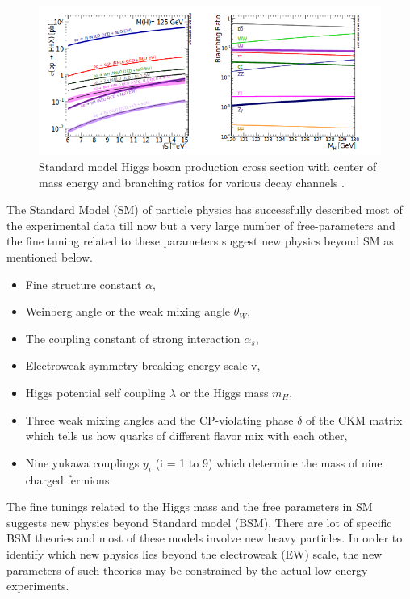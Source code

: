 \documentclass[final,3p]{CSP}
\begin{document}
\begin{figure}[H]
  \centering
   \includegraphics[scale=0.7]{./cd2.png}
  \caption{Standard model Higgs boson production cross section with center of mass energy and branching ratios for various decay channels \cite{Tanabashi:2018oca}.}
   \label{figure 3}
\end{figure}
\clearpage

 \newpage

The Standard Model (SM) of particle physics has successfully described most of the experimental data till now but a very large 
number of free-parameters and the fine tuning related to these parameters suggest new physics beyond SM as mentioned below.
\begin{itemize}
\item{Fine structure constant $\alpha$},
\item{Weinberg angle or the weak mixing angle $\theta_W$},
\item{The coupling constant of strong interaction $\alpha_s$},
\item{Electroweak symmetry breaking energy scale v},
\item{ Higgs potential self coupling $\lambda$ or the Higgs mass $m_H$},
\item{Three weak mixing angles and the CP-violating phase $\delta$ of the CKM matrix which tells us how quarks of different flavor mix with each other},
\item{Nine yukawa couplings $y_i$ (i = 1 to 9) which determine the mass of nine charged fermions}.
\end{itemize}
 The fine 
tunings related to the Higgs 
mass and the free parameters in SM suggests new physics beyond Standard model (BSM). There are lot of specific 
BSM theories and most of these 
models involve new heavy particles. In order to identify which new physics lies beyond the 
electroweak (EW) scale, the new parameters 
of such theories may be constrained by the actual low energy experiments.
\end{document}
